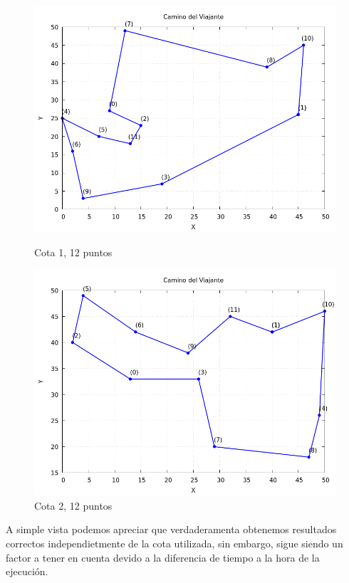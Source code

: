 \documentclass[11pt,openany]{book}
\begin{document}
\begin{figure}[H]
      \centering
      \begin{minipage}{.48\textwidth}
            \centering
            \includegraphics[width=1\linewidth]{assets/Img/Cota_1_BB/grafico_12_1.png}
            \caption{Cota 1, 12 puntos}
            \label{fig:Cota 1}
      \end{minipage}%
      \begin{minipage}{.48\textwidth}
            \centering
            \includegraphics[width=1\linewidth]{assets/Img/Cota_2_BB/grafico_12_1.png}
            \caption{Cota 2, 12 puntos}
            \label{fig:Cota 2}
      \end{minipage}
\end{figure}

A simple vista podemos apreciar que verdaderamenta obtenemos resultados correctos independietmente de la 
cota utilizada, sin embargo, sigue siendo un factor a tener en cuenta devido a la diferencia de tiempo a la 
hora de la ejecución.
\end{document}
